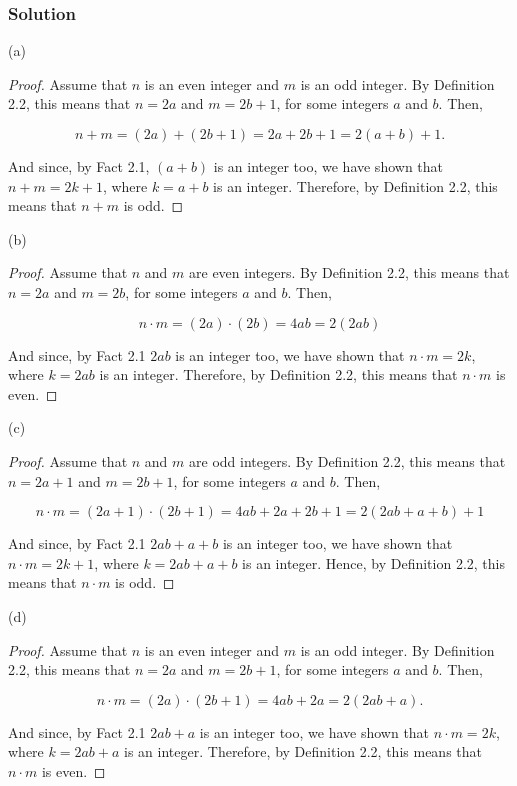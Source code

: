 \documentclass{article}
\begin{document}
\subsubsection*{Solution}

(a)
\begin{proof}
    Assume that $n$ is an even integer and $m$ is an odd integer. By Definition 2.2, this means that $n=2a$ and $m=2b+1$, for some integers $a$ and $b$. Then,

\[n+m=(2a)+(2b+1)=2a+2b+1=2(a+b)+1.\]

    And since, by Fact 2.1, $(a+b)$ is an integer too, we have shown that $n+m=2k+1$, where $k=a+b$ is an integer. Therefore, by Definition 2.2, this means that $n+m$ is odd.
\end{proof}

\noindent(b)

\begin{proof}
    Assume that $n$  and $m$ are even integers. By Definition 2.2, this means that $n=2a$ and $m=2b$, for some integers $a$ and $b$.
    Then,

    \[n \cdot m=(2a)\cdot(2b)=4ab=2(2ab)\]

    And since, by Fact 2.1 $2ab$ is an integer too, we have shown that $n\cdot m=2k$, where $k=2ab$ is an integer. Therefore, by Definition 2.2, this means that $n \cdot m$ is even.
\end{proof}
    
\noindent(c)

\begin{proof}
    Assume that $n$  and $m$ are odd integers. By Definition 2.2, this means that $n=2a+1$ and $m=2b+1$, for some integers $a$ and $b$.
    Then,

   \[n \cdot m=(2a+1)\cdot(2b+1)=4ab+2a+2b+1=2(2ab+a+b)+1\]

   And since, by Fact 2.1 $2ab+a+b$ is an integer too, we have shown that $n\cdot m=2k+1$, where $k=2ab+a+b$ is an integer. Hence, by Definition 2.2, this means that $n \cdot m$ is odd.
\end{proof}

\newpage

\noindent(d)

\begin{proof}
    Assume that $n$ is an even integer and $m$ is an odd integer. By Definition 2.2, this means that $n=2a$ and $m=2b+1$, for some integers $a$ and $b$. Then,

    \[n\cdot m=(2a)\cdot(2b+1)=4ab+2a=2(2ab+a).\]

    And since, by Fact 2.1 $2ab+a$ is an integer too, we have shown that $n\cdot m=2k$, where $k=2ab+a$ is an integer. Therefore, by Definition 2.2, this means that $n \cdot m$ is even.
\end{proof}
\end{document}
